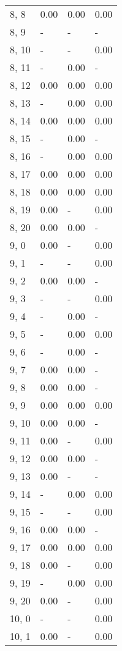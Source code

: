 \begin{table}
\begin{tabular}{llll}
8, 8   &  0.00 &  0.00 &  0.00 \\
8, 9   &     - &     - &     - \\
8, 10  &     - &     - &  0.00 \\
8, 11  &     - &  0.00 &     - \\
8, 12  &  0.00 &  0.00 &  0.00 \\
8, 13  &     - &  0.00 &  0.00 \\
8, 14  &  0.00 &  0.00 &  0.00 \\
8, 15  &     - &  0.00 &     - \\
8, 16  &     - &  0.00 &  0.00 \\
8, 17  &  0.00 &  0.00 &  0.00 \\
8, 18  &  0.00 &  0.00 &  0.00 \\
8, 19  &  0.00 &     - &  0.00 \\
8, 20  &  0.00 &  0.00 &     - \\
9, 0   &  0.00 &     - &  0.00 \\
9, 1   &     - &     - &  0.00 \\
9, 2   &  0.00 &  0.00 &     - \\
9, 3   &     - &     - &  0.00 \\
9, 4   &     - &  0.00 &     - \\
9, 5   &     - &  0.00 &  0.00 \\
9, 6   &     - &  0.00 &     - \\
9, 7   &  0.00 &  0.00 &     - \\
9, 8   &  0.00 &  0.00 &     - \\
9, 9   &  0.00 &  0.00 &  0.00 \\
9, 10  &  0.00 &  0.00 &     - \\
9, 11  &  0.00 &     - &  0.00 \\
9, 12  &  0.00 &  0.00 &     - \\
9, 13  &  0.00 &     - &     - \\
9, 14  &     - &  0.00 &  0.00 \\
9, 15  &     - &     - &  0.00 \\
9, 16  &  0.00 &  0.00 &     - \\
9, 17  &  0.00 &  0.00 &  0.00 \\
9, 18  &  0.00 &     - &  0.00 \\
9, 19  &     - &  0.00 &  0.00 \\
9, 20  &  0.00 &     - &  0.00 \\
10, 0  &     - &     - &  0.00 \\
10, 1  &  0.00 &     - &  0.00 \\

\end{tabular}
\end{table}
